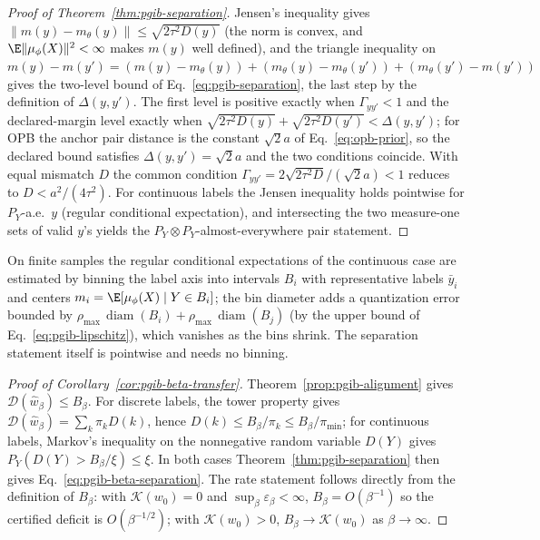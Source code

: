 \begin{proof}[Proof of Theorem~\ref{thm:pgib-separation}]
Jensen's inequality gives
$\|m(y) - m_\theta(y)\| \le \sqrt{2\tau^2 D(y)}$
(the norm is convex, and $\E\|\mu_\phi(X)\|^2<\infty$ makes $m(y)$ well defined),
and the triangle inequality on
$m(y) - m(y') = (m(y) - m_\theta(y)) + (m_\theta(y) - m_\theta(y'))
+ (m_\theta(y') - m(y'))$ gives the two-level bound of
Eq.~\eqref{eq:pgib-separation}, the last step
by the definition of $\Delta(y,y')$. The first level is positive exactly
when $\Gamma_{yy'}<1$ and the declared-margin level exactly when
$\sqrt{2\tau^2D(y)}+\sqrt{2\tau^2D(y')}<\Delta(y,y')$; for OPB the
anchor pair distance is the constant $\sqrt2a$ of
Eq.~\eqref{eq:opb-prior}, so the declared bound satisfies $\Delta(y,y')=\sqrt2a$ and
the two conditions coincide. With equal mismatch $D$ the common condition
$\Gamma_{yy'}=2\sqrt{2\tau^2D}/(\sqrt2a)<1$ reduces to
$D<a^2/(4\tau^2)$. For continuous labels the Jensen inequality holds
pointwise for $P_Y$-a.e.\ $y$ (regular conditional expectation), and intersecting
the two measure-one sets of valid $y$'s yields the $P_Y\otimes P_Y$-almost-everywhere
pair statement.
\end{proof}

\begin{remark}
\label{rem:pgib-binning}
On finite samples the regular conditional expectations of the continuous case are
estimated by
binning the label axis into intervals $B_i$ with representative labels $\bar y_i$
and centers $m_i = \E[\mu_\phi(X) \mid Y \in B_i]$; the bin diameter adds a
quantization error bounded by
$\rho_{\max}\,\operatorname{diam}(B_i) + \rho_{\max}\,\operatorname{diam}(B_j)$ (by
the upper bound of Eq.~\eqref{eq:pgib-lipschitz}), which vanishes as the bins
shrink. The separation statement itself is pointwise and needs no binning.
\end{remark}

\begin{proof}[Proof of Corollary~\ref{cor:pgib-beta-transfer}]
Theorem~\ref{prop:pgib-alignment} gives
$\mathcal D(\widehat w_\beta)\le B_\beta$. For discrete labels, the tower property
gives $\mathcal D(\widehat w_\beta)=\sum_k\pi_kD(k)$, hence
$D(k)\le B_\beta/\pi_k\le B_\beta/\pi_{\min}$; for continuous labels, Markov's
inequality on the nonnegative random variable $D(Y)$ gives
$P_Y(D(Y)>B_\beta/\xi)\le\xi$. In both cases
Theorem~\ref{thm:pgib-separation} then gives
Eq.~\eqref{eq:pgib-beta-separation}. The rate statement follows
directly from the definition of $B_\beta$: with $\mathcal K(w_0)=0$ and
$\sup_\beta\varepsilon_\beta<\infty$, $B_\beta=O(\beta^{-1})$ so the certified
deficit is $O(\beta^{-1/2})$; with $\mathcal K(w_0)>0$,
$B_\beta\to\mathcal K(w_0)$ as $\beta\to\infty$.
\end{proof}

